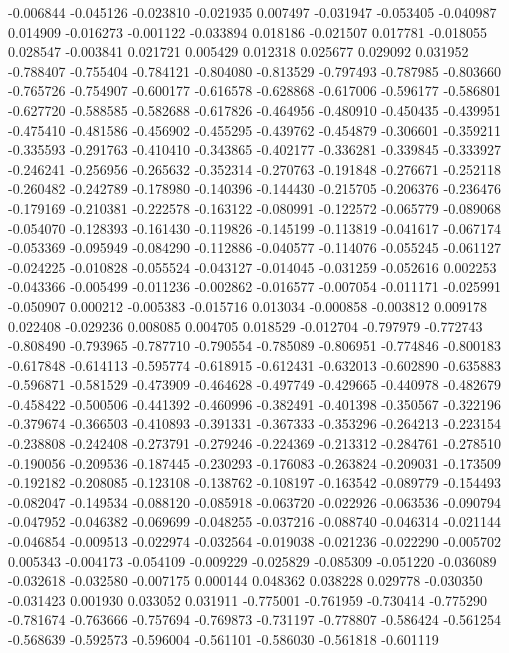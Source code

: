 -0.006844
-0.045126
-0.023810
-0.021935
0.007497
-0.031947
-0.053405
-0.040987
0.014909
-0.016273
-0.001122
-0.033894
0.018186
-0.021507
0.017781
-0.018055
0.028547
-0.003841
0.021721
0.005429
0.012318
0.025677
0.029092
0.031952
-0.788407
-0.755404
-0.784121
-0.804080
-0.813529
-0.797493
-0.787985
-0.803660
-0.765726
-0.754907
-0.600177
-0.616578
-0.628868
-0.617006
-0.596177
-0.586801
-0.627720
-0.588585
-0.582688
-0.617826
-0.464956
-0.480910
-0.450435
-0.439951
-0.475410
-0.481586
-0.456902
-0.455295
-0.439762
-0.454879
-0.306601
-0.359211
-0.335593
-0.291763
-0.410410
-0.343865
-0.402177
-0.336281
-0.339845
-0.333927
-0.246241
-0.256956
-0.265632
-0.352314
-0.270763
-0.191848
-0.276671
-0.252118
-0.260482
-0.242789
-0.178980
-0.140396
-0.144430
-0.215705
-0.206376
-0.236476
-0.179169
-0.210381
-0.222578
-0.163122
-0.080991
-0.122572
-0.065779
-0.089068
-0.054070
-0.128393
-0.161430
-0.119826
-0.145199
-0.113819
-0.041617
-0.067174
-0.053369
-0.095949
-0.084290
-0.112886
-0.040577
-0.114076
-0.055245
-0.061127
-0.024225
-0.010828
-0.055524
-0.043127
-0.014045
-0.031259
-0.052616
0.002253
-0.043366
-0.005499
-0.011236
-0.002862
-0.016577
-0.007054
-0.011171
-0.025991
-0.050907
0.000212
-0.005383
-0.015716
0.013034
-0.000858
-0.003812
0.009178
0.022408
-0.029236
0.008085
0.004705
0.018529
-0.012704
-0.797979
-0.772743
-0.808490
-0.793965
-0.787710
-0.790554
-0.785089
-0.806951
-0.774846
-0.800183
-0.617848
-0.614113
-0.595774
-0.618915
-0.612431
-0.632013
-0.602890
-0.635883
-0.596871
-0.581529
-0.473909
-0.464628
-0.497749
-0.429665
-0.440978
-0.482679
-0.458422
-0.500506
-0.441392
-0.460996
-0.382491
-0.401398
-0.350567
-0.322196
-0.379674
-0.366503
-0.410893
-0.391331
-0.367333
-0.353296
-0.264213
-0.223154
-0.238808
-0.242408
-0.273791
-0.279246
-0.224369
-0.213312
-0.284761
-0.278510
-0.190056
-0.209536
-0.187445
-0.230293
-0.176083
-0.263824
-0.209031
-0.173509
-0.192182
-0.208085
-0.123108
-0.138762
-0.108197
-0.163542
-0.089779
-0.154493
-0.082047
-0.149534
-0.088120
-0.085918
-0.063720
-0.022926
-0.063536
-0.090794
-0.047952
-0.046382
-0.069699
-0.048255
-0.037216
-0.088740
-0.046314
-0.021144
-0.046854
-0.009513
-0.022974
-0.032564
-0.019038
-0.021236
-0.022290
-0.005702
0.005343
-0.004173
-0.054109
-0.009229
-0.025829
-0.085309
-0.051220
-0.036089
-0.032618
-0.032580
-0.007175
0.000144
0.048362
0.038228
0.029778
-0.030350
-0.031423
0.001930
0.033052
0.031911
-0.775001
-0.761959
-0.730414
-0.775290
-0.781674
-0.763666
-0.757694
-0.769873
-0.731197
-0.778807
-0.586424
-0.561254
-0.568639
-0.592573
-0.596004
-0.561101
-0.586030
-0.561818
-0.601119
